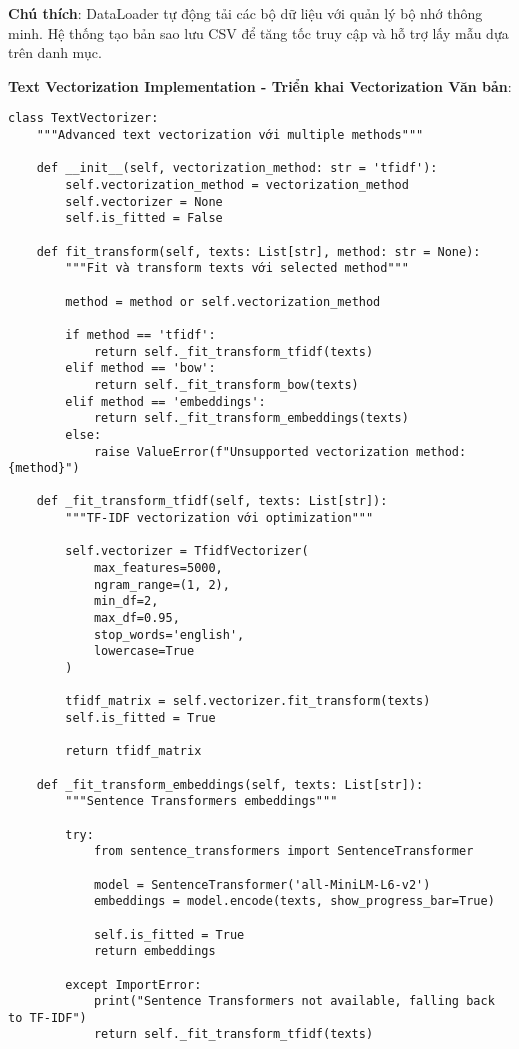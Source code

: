 \textbf{Chú thích}: DataLoader tự động tải các bộ dữ liệu với quản lý bộ nhớ thông minh. Hệ thống tạo bản sao lưu CSV để tăng tốc truy cập và hỗ trợ lấy mẫu dựa trên danh mục.

\textbf{Text Vectorization Implementation - Triển khai Vectorization Văn bản}:

\begin{verbatim}
class TextVectorizer:
    """Advanced text vectorization với multiple methods"""
    
    def __init__(self, vectorization_method: str = 'tfidf'):
        self.vectorization_method = vectorization_method
        self.vectorizer = None
        self.is_fitted = False
        
    def fit_transform(self, texts: List[str], method: str = None):
        """Fit và transform texts với selected method"""
        
        method = method or self.vectorization_method
        
        if method == 'tfidf':
            return self._fit_transform_tfidf(texts)
        elif method == 'bow':
            return self._fit_transform_bow(texts)
        elif method == 'embeddings':
            return self._fit_transform_embeddings(texts)
        else:
            raise ValueError(f"Unsupported vectorization method: {method}")
            
    def _fit_transform_tfidf(self, texts: List[str]):
        """TF-IDF vectorization với optimization"""
        
        self.vectorizer = TfidfVectorizer(
            max_features=5000,
            ngram_range=(1, 2),
            min_df=2,
            max_df=0.95,
            stop_words='english',
            lowercase=True
        )
        
        tfidf_matrix = self.vectorizer.fit_transform(texts)
        self.is_fitted = True
        
        return tfidf_matrix
        
    def _fit_transform_embeddings(self, texts: List[str]):
        """Sentence Transformers embeddings"""
        
        try:
            from sentence_transformers import SentenceTransformer
            
            model = SentenceTransformer('all-MiniLM-L6-v2')
            embeddings = model.encode(texts, show_progress_bar=True)
            
            self.is_fitted = True
            return embeddings
            
        except ImportError:
            print("Sentence Transformers not available, falling back to TF-IDF")
            return self._fit_transform_tfidf(texts)
\end{verbatim}

